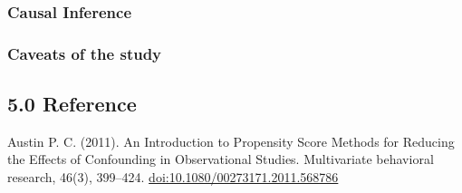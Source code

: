 \documentclass[]{article}
\begin{document}
\hypertarget{causal-inference}{%
\subsubsection{Causal Inference}\label{causal-inference}}

\hypertarget{caveats-of-the-study}{%
\subsubsection{Caveats of the study}\label{caveats-of-the-study}}

\hypertarget{reference}{%
\subsection{5.0 Reference}\label{reference}}

Austin P. C. (2011). An Introduction to Propensity Score Methods for Reducing the Effects of Confounding in Observational Studies. Multivariate behavioral research, 46(3), 399--424. \url{doi:10.1080/00273171.2011.568786}
\end{document}
